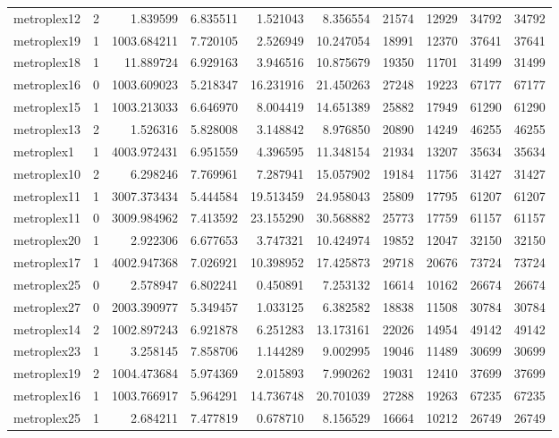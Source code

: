 \begin{longtable}{|l|r|r|r|r|r|r|r|r|r|}
metroplex12 & 2 & 1.839599 & 6.835511 & 1.521043 & 8.356554 & 21574 & 12929 & 34792 & 34792 \\
metroplex19 & 1 & 1003.684211 & 7.720105 & 2.526949 & 10.247054 & 18991 & 12370 & 37641 & 37641 \\
metroplex18 & 1 & 11.889724 & 6.929163 & 3.946516 & 10.875679 & 19350 & 11701 & 31499 & 31499 \\
metroplex16 & 0 & 1003.609023 & 5.218347 & 16.231916 & 21.450263 & 27248 & 19223 & 67177 & 67177 \\
metroplex15 & 1 & 1003.213033 & 6.646970 & 8.004419 & 14.651389 & 25882 & 17949 & 61290 & 61290 \\
metroplex13 & 2 & 1.526316 & 5.828008 & 3.148842 & 8.976850 & 20890 & 14249 & 46255 & 46255 \\
metroplex1 & 1 & 4003.972431 & 6.951559 & 4.396595 & 11.348154 & 21934 & 13207 & 35634 & 35634 \\
metroplex10 & 2 & 6.298246 & 7.769961 & 7.287941 & 15.057902 & 19184 & 11756 & 31427 & 31427 \\
metroplex11 & 1 & 3007.373434 & 5.444584 & 19.513459 & 24.958043 & 25809 & 17795 & 61207 & 61207 \\
metroplex11 & 0 & 3009.984962 & 7.413592 & 23.155290 & 30.568882 & 25773 & 17759 & 61157 & 61157 \\
metroplex20 & 1 & 2.922306 & 6.677653 & 3.747321 & 10.424974 & 19852 & 12047 & 32150 & 32150 \\
metroplex17 & 1 & 4002.947368 & 7.026921 & 10.398952 & 17.425873 & 29718 & 20676 & 73724 & 73724 \\
metroplex25 & 0 & 2.578947 & 6.802241 & 0.450891 & 7.253132 & 16614 & 10162 & 26674 & 26674 \\
metroplex27 & 0 & 2003.390977 & 5.349457 & 1.033125 & 6.382582 & 18838 & 11508 & 30784 & 30784 \\
metroplex14 & 2 & 1002.897243 & 6.921878 & 6.251283 & 13.173161 & 22026 & 14954 & 49142 & 49142 \\
metroplex23 & 1 & 3.258145 & 7.858706 & 1.144289 & 9.002995 & 19046 & 11489 & 30699 & 30699 \\
metroplex19 & 2 & 1004.473684 & 5.974369 & 2.015893 & 7.990262 & 19031 & 12410 & 37699 & 37699 \\
metroplex16 & 1 & 1003.766917 & 5.964291 & 14.736748 & 20.701039 & 27288 & 19263 & 67235 & 67235 \\
metroplex25 & 1 & 2.684211 & 7.477819 & 0.678710 & 8.156529 & 16664 & 10212 & 26749 & 26749 \\

\end{longtable}
